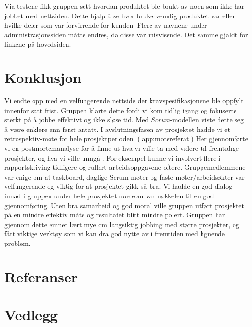 \documentclass[12pt,a4paper,norsk]{article}
\begin{document}
Via testene fikk gruppen sett hvordan produktet ble brukt av noen som ikke har jobbet med nettsiden. Dette hjalp å se hvor brukervennlig produktet var eller hvilke deler som var forvirrende for kunden. Flere av navnene under administrasjonssiden måtte endres, da disse var misvisende. Det samme gjaldt for linkene på hovedsiden.

\section{Konklusjon}
Vi endte opp med en velfungerende nettside der kravspesifikasjonene ble oppfylt innenfor satt frist. Gruppen klarte dette fordi vi kom tidlig igang og fokuserte sterkt på å jobbe effektivt og ikke sløse tid. Med \textit{Scrum}-modellen viste dette seg å være enklere enn først antatt. I avslutningsfasen av prosjektet hadde vi et retrospektiv-møte for hele prosjektperioden. (\cref{app:motereferat}) Her gjennomførte vi en postmortemanalyse for å finne ut hva vi ville ta med videre til fremtidige prosjekter, og hva vi ville unngå \cite[side 37]{dyba}. For eksempel kunne vi involvert flere i rapportskriving tidligere og rullert arbeidsoppgavene oftere. Gruppemedlemmene var enige om at taskboard, daglige Scrum-møter og faste møter/arbeidsøkter var velfungerende og viktig for at prosjektet gikk så bra. Vi hadde en god dialog innad i gruppen under hele prosjektet noe som var nøkkelen til en god gjennomføring. Uten bra samarbeid og god moral ville gruppen utført prosjektet på en mindre effektiv måte og resultatet blitt mindre polert. Gruppen har gjennom dette emnet lært mye om langsiktig jobbing med større prosjekter, og fått viktige verktøy som vi kan dra god nytte av i fremtiden med lignende problem.


\newpage
{}
\section{Referanser}


\section{Vedlegg}



\end{document}

